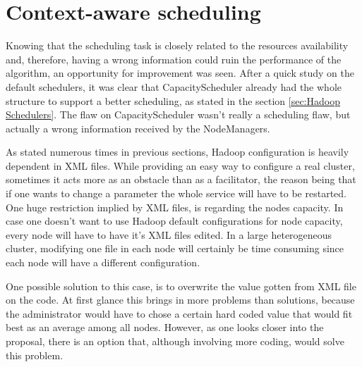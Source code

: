 %
%
%
%
%

\section{Context-aware scheduling}
Knowing that the scheduling task is closely related to the resources availability and, therefore, having a wrong information could ruin the performance of the algorithm, an opportunity for improvement was seen. After a quick study on the default schedulers, it was clear that CapacityScheduler already had the whole structure to support a better scheduling, as stated in the section \ref{sec:Hadoop Schedulers}. The flaw on CapacityScheduler wasn't really a scheduling flaw, but actually a wrong information received by the NodeManagers.

As stated numerous times in previous sections, Hadoop configuration is heavily dependent in XML files. While providing an easy way to configure a real cluster, sometimes it acts more as an obstacle than as a facilitator, the reason being that if one wants to change a parameter the whole service will have to be restarted. One huge restriction implied by XML files, is regarding the nodes capacity. In case one doesn't want to use Hadoop default configurations for node capacity, every node will have to have it's XML files edited. In a large heterogeneous cluster, modifying one file in each node will certainly be time consuming since each node will have a different configuration. 

One possible solution to this case, is to overwrite the value gotten from XML file on the code. At first glance this brings in more problems than solutions, because the administrator would have to chose a certain hard coded value that would fit best as an average among all nodes. However, as one looks closer into the proposal, there is an option that, although involving more coding, would solve this problem. 

